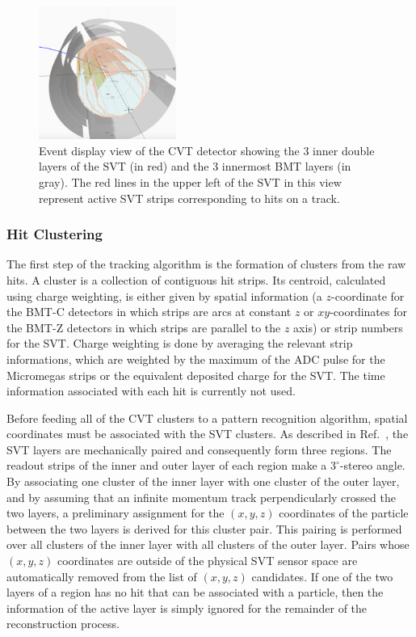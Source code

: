 \begin{figure}
\centering
\includegraphics[width=0.4\textwidth]{pics/cvt.png}
\caption{Event display view of the CVT detector showing the 3 inner double layers of the SVT (in red) and the 3 innermost
  BMT layers (in gray). The red lines in the upper left of the SVT in this view represent active SVT strips
  corresponding to hits on a track.}
\label{fig:cvt}
\end{figure}

\subsubsection{Hit Clustering}

The first step of the tracking algorithm is the formation of clusters from the raw hits. A cluster is a collection of contiguous hit strips. Its centroid, calculated using charge weighting, is either given by spatial information
(a $z$-coordinate for the BMT-C detectors in which strips are arcs at constant $z$ or $xy$-coordinates for the
BMT-Z detectors in which strips are parallel to the $z$ axis) or strip numbers for the SVT. Charge weighting is done by averaging the relevant strip informations, which are weighted by the maximum of the ADC pulse for
the Micromegas strips or the equivalent deposited charge for the SVT. The time information associated with each hit
is currently not used.

Before feeding all of the CVT clusters to a pattern recognition algorithm, spatial coordinates must be associated with
the SVT clusters. As described in Ref.~\cite{svt-nim}, the SVT layers are mechanically paired and consequently form
three regions. The readout strips of the inner and outer layer of each region make a $3^\circ$-stereo angle. By
associating one cluster of the inner layer with one cluster of the outer layer, and by assuming that an infinite
momentum track perpendicularly crossed the two layers, a preliminary assignment for the $(x,y,z)$ coordinates of
the particle between the two layers is derived for this cluster pair. This pairing is performed over all clusters of the
inner layer with all clusters of the outer layer. Pairs whose $(x,y,z)$ coordinates are outside of the physical SVT
sensor space are automatically removed from the list of $(x,y,z)$ candidates. If one of the two layers of a region has
no hit that can be associated with a particle, then the information of the active layer is simply ignored for the
remainder of the reconstruction process.

